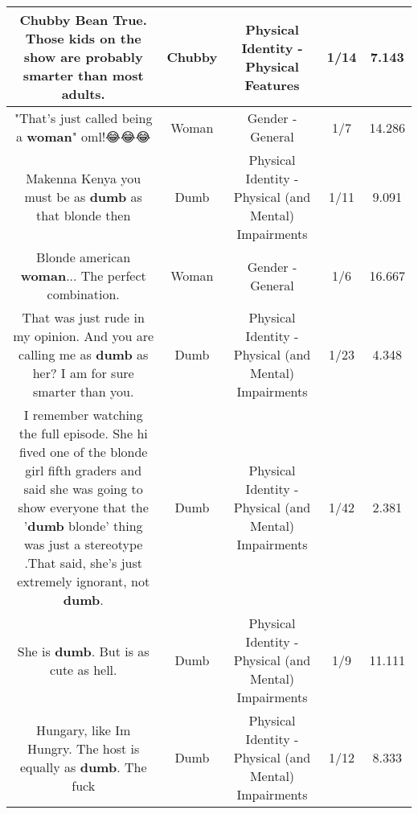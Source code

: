 \documentclass[11pt]{article}
\newlength\mylength
\begin{document}
\begin{center}
\begin{longtable}{|C{.65\mylength}|C{.30\mylength}|C{.12\mylength}|C{.12\mylength}|C{.12\mylength}|}
  \small Chubby Bean True. Those kids on the show are probably smarter than most adults.\normalsize   & Chubby & Physical Identity - Physical Features & 1/14 & 7.143 \\  \hline
  \small "That's just called being a \textbf{woman}" oml!😂😂😂\normalsize   & Woman & Gender - General & 1/7 & 14.286 \\  \hline
  \small Makenna Kenya you must be as \textbf{dumb} as that blonde then\normalsize   & Dumb & Physical Identity - Physical (and Mental) Impairments & 1/11 & 9.091 \\  \hline
  \small Blonde american \textbf{woman}... The perfect combination.\normalsize   & Woman & Gender - General & 1/6 & 16.667 \\  \hline
  \small That was just rude in my opinion. And you are calling me as \textbf{dumb} as her? I am for sure smarter than you.\normalsize   & Dumb & Physical Identity - Physical (and Mental) Impairments & 1/23 & 4.348 \\  \hline
  \small I remember watching the full episode. She hi fived one of the blonde girl fifth graders and said she was going to show everyone that the '\textbf{dumb} blonde' thing was just a stereotype .That said, she's just extremely ignorant, not \textbf{dumb}.\normalsize   & Dumb & Physical Identity - Physical (and Mental) Impairments & 1/42 & 2.381 \\  \hline
  \small She is \textbf{dumb}. But is as cute as hell.\normalsize   & Dumb & Physical Identity - Physical (and Mental) Impairments & 1/9 & 11.111 \\  \hline
  \small Hungary, like Im Hungry. The host is equally as \textbf{dumb}. The fuck\normalsize   & Dumb & Physical Identity - Physical (and Mental) Impairments & 1/12 & 8.333 \\  \hline

\end{longtable}
\end{center}
\end{document}
